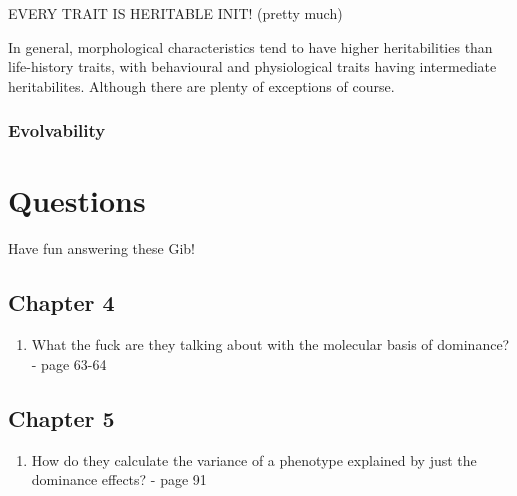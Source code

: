 \documentclass[
]{book}
\providecommand{\tightlist}{%
  \setlength{\itemsep}{0pt}\setlength{\parskip}{0pt}}
\begin{document}
EVERY TRAIT IS HERITABLE INIT! (pretty much)

In general, morphological characteristics tend to have higher heritabilities than life-history traits, with behavioural and physiological traits having intermediate heritabilites. Although there are plenty of exceptions of course.

\hypertarget{evolvability}{%
\subsection{Evolvability}\label{evolvability}}

\hypertarget{questions}{%
\chapter*{Questions}\label{questions}}

Have fun answering these Gib!

\hypertarget{chapter-4}{%
\section*{Chapter 4}\label{chapter-4}}

\begin{enumerate}
\def\labelenumi{\arabic{enumi}.}
\tightlist
\item
  What the fuck are they talking about with the molecular basis of dominance? - page 63-64
\end{enumerate}

\hypertarget{chapter-5}{%
\section*{Chapter 5}\label{chapter-5}}

\begin{enumerate}
\def\labelenumi{\arabic{enumi}.}
\tightlist
\item
  How do they calculate the variance of a phenotype explained by just the dominance effects? - page 91
\end{enumerate}
\end{document}
